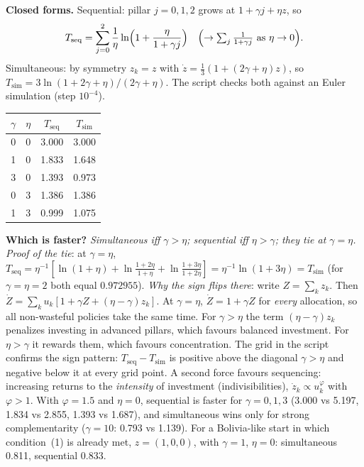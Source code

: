 \documentclass[../solutions_manual.tex]{subfiles}
\begin{document}
 \textbf{Closed forms.} Sequential: pillar $j = 0,1,2$ grows at $1 + \gamma j + \eta z$, so
\[
T_{\text{seq}} = \sum_{j=0}^{2}\frac{1}{\eta}\ln\Bigl(1 + \frac{\eta}{1 + \gamma j}\Bigr)\quad\Bigl(\to \textstyle\sum_j \frac{1}{1+\gamma j}\ \text{as } \eta \to 0\Bigr).
\]
Simultaneous: by symmetry $z_k = z$ with $\dot z = \tfrac13(1 + (2\gamma + \eta)z)$, so $T_{\text{sim}} = 3\ln(1 + 2\gamma + \eta)/(2\gamma + \eta)$. The script checks both against an Euler simulation (step $10^{-4}$).
\begin{center}
\begin{tabular}{cccc}
\toprule
$\gamma$ & $\eta$ & $T_{\text{seq}}$ & $T_{\text{sim}}$ \\
\midrule
0 & 0 & 3.000 & 3.000 \\
1 & 0 & 1.833 & 1.648 \\
3 & 0 & 1.393 & 0.973 \\
0 & 3 & 1.386 & 1.386 \\
1 & 3 & 0.999 & 1.075 \\
\bottomrule
\end{tabular}
\end{center}

 \textbf{Which is faster?} \emph{Simultaneous iff $\gamma > \eta$; sequential iff $\eta > \gamma$; they tie at $\gamma = \eta$.} \emph{Proof of the tie}: at $\gamma = \eta$, $T_{\text{seq}} = \eta^{-1}[\ln(1+\eta) + \ln\frac{1+2\eta}{1+\eta} + \ln\frac{1+3\eta}{1+2\eta}] = \eta^{-1}\ln(1+3\eta) = T_{\text{sim}}$ (for $\gamma = \eta = 2$ both equal $0.972955$). \emph{Why the sign flips there}: write $Z = \sum_k z_k$. Then $\dot Z = \sum_k u_k[1 + \gamma Z + (\eta - \gamma)z_k]$. At $\gamma = \eta$, $\dot Z = 1 + \gamma Z$ for \emph{every} allocation, so all non-wasteful policies take the same time. For $\gamma > \eta$ the term $(\eta - \gamma)z_k$ penalizes investing in advanced pillars, which favours balanced investment. For $\eta > \gamma$ it rewards them, which favours concentration. The grid in the script confirms the sign pattern: $T_{\text{seq}} - T_{\text{sim}}$ is positive above the diagonal $\gamma > \eta$ and negative below it at every grid point. A second force favours sequencing: increasing returns to the \emph{intensity} of investment (indivisibilities), $\dot z_k \propto u_k^{\varphi}$ with $\varphi > 1$. With $\varphi = 1.5$ and $\eta = 0$, sequential is faster for $\gamma = 0, 1, 3$ (3.000 vs 5.197, 1.834 vs 2.855, 1.393 vs 1.687), and simultaneous wins only for strong complementarity ($\gamma = 10$: 0.793 vs 1.139). For a Bolivia-like start in which condition~(1) is already met, $z = (1, 0, 0)$, with $\gamma = 1$, $\eta = 0$: simultaneous 0.811, sequential 0.833.
\end{document}
